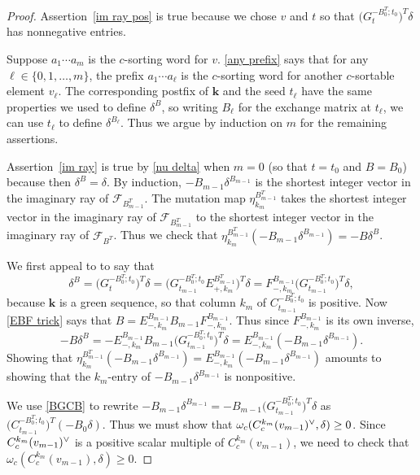 \documentclass{amsart}
\theoremstyle{definition}
\theoremstyle{remark}
\numberwithin{equation}{section}
\newcommand{\set}[1]{{\lbrace #1 \rbrace}}
\newcommand{\F}{{\mathcal F}}
\newcommand{\ck}{\spcheck}
\newcommand{\0}{{\mathbf{0}}}
\newcommand{\kk}{\mathbf{k}}
\begin{document}
\begin{proof}%
Assertion~\ref{im ray pos} is true because we chose $v$ and $t$ so that $\bigl(G_t^{-B_0^T;t_0}\bigr)^T\delta$ has nonnegative entries.

Suppose $a_1\cdots a_m$ is the $c$-sorting word for $v$.
\cref{any prefix} says that for any ${\ell\in\set{0,1,\ldots,m}}$, the prefix $a_1\cdots a_\ell$ is the $c$-sorting word for another $c$-sortable element $v_\ell$.
The corresponding postfix of $\kk$ and the seed $t_\ell$ have the same properties we used to define $\delta^B$, so writing $B_\ell$ for the exchange matrix at $t_\ell$, we can use $t_\ell$ to define $\delta^{B_\ell}$.
Thus we argue by induction on $m$ for the remaining assertions.

Assertion~\ref{im ray} is true by \cref{nu delta} when $m=0$ (so that $t=t_0$ and $B=B_0$) because then $\delta^B=\delta$.
By induction, $-B_{m-1}\delta^{B_{m-1}}$ is the shortest integer vector in the imaginary ray of $\F_{B_{m-1}^T}$.
The mutation map $\eta_{k_m}^{B_{m-1}^T}$ takes the shortest integer vector in the imaginary ray of $\F_{B_{m-1}^T}$ to the shortest integer vector in the imaginary ray of $\F_{B^T}$. 
Thus we check that $\eta_{k_m}^{B_{m-1}^T}(-B_{m-1}\delta^{B_{m-1}})=-B\delta^{B}$.

We first appeal to \cite[Proposition~1.3]{NZ} to say that 
\[\delta^B=\bigl(G_t^{-B_0^T;t_0}\bigr)^T\delta=\bigl(G_{t_{m-1}}^{-B_0^T;t_0}E_{+,k_m}^{B_{m-1}^T}\bigr)^T\delta=F_{-,k_m}^{B_{m-1}}\bigl(G_{t_{m-1}}^{-B_0^T;t_0}\bigr)^T\delta,\]
because $\kk$ is a green sequence, so that column $k_m$ of $C_{t_{m-1}}^{-B_0^T;t_0}$ is positive.
Now \cref{EBF trick} says that $B=E_{-,k_m}^{B_{m-1}}B_{m-1}F_{-,k_m}^{B_{m-1}}$.
Thus since $F_{-,k_m}^{B_{m-1}}$ is its own inverse, 
\[-B\delta^B=-E_{-,k_m}^{B_{m-1}}B_{m-1}\bigl(G_{t_{m-1}}^{-B_0^T;t_0}\bigr)^T\delta=E_{-,k_m}^{B_{m-1}}(-B_{m-1}\delta^{B_{m-1}}).\]
Showing that $\eta_{k_m}^{B_{m-1}^T}(-B_{m-1}\delta^{B_{m-1}})=E_{-,k_m}^{B_{m-1}}(-B_{m-1}\delta^{B_{m-1}})$ amounts to showing that the $k_m$-entry of $-B_{m-1}\delta^{B_{m-1}}$ is nonpositive.

We use \cref{BGCB} to rewrite $-B_{m-1}\delta^{B_{m-1}}=-B_{m-1}\bigl(G_{t_{m-1}}^{-B_0^T;t_0}\bigr)^T\delta$ as $\bigl(C_{t_{m-1}}^{-B_0^T;t_0}\bigr)^T(-B_0\delta)$.
Thus we must show that $\omega_c(C^{k_m}_c(v_{m-1})\ck,\delta)\ge0$. 
Since $C^{k_m}_c(v_{m-1})\ck$ is a positive scalar multiple of $C^{k_m}_c(v_{m-1})$, we need to check that $\omega_c(C^{k_m}_c(v_{m-1}),\delta)\ge0$. 


\end{proof}
\end{document}
